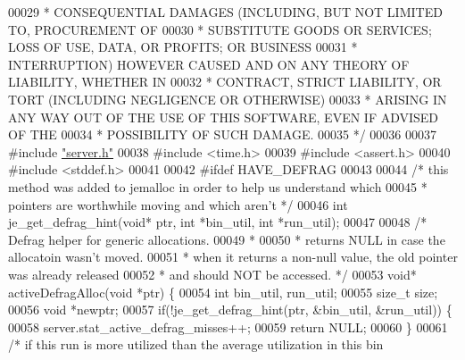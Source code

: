 \begin{DoxyCode}
00029 \textcolor{comment}{ * CONSEQUENTIAL DAMAGES (INCLUDING, BUT NOT LIMITED TO, PROCUREMENT OF}
00030 \textcolor{comment}{ * SUBSTITUTE GOODS OR SERVICES; LOSS OF USE, DATA, OR PROFITS; OR BUSINESS}
00031 \textcolor{comment}{ * INTERRUPTION) HOWEVER CAUSED AND ON ANY THEORY OF LIABILITY, WHETHER IN}
00032 \textcolor{comment}{ * CONTRACT, STRICT LIABILITY, OR TORT (INCLUDING NEGLIGENCE OR OTHERWISE)}
00033 \textcolor{comment}{ * ARISING IN ANY WAY OUT OF THE USE OF THIS SOFTWARE, EVEN IF ADVISED OF THE}
00034 \textcolor{comment}{ * POSSIBILITY OF SUCH DAMAGE.}
00035 \textcolor{comment}{ */}
00036 
00037 \textcolor{preprocessor}{#}\textcolor{preprocessor}{include} \hyperlink{server_8h}{"server.h"}
00038 \textcolor{preprocessor}{#}\textcolor{preprocessor}{include} \textcolor{preprocessor}{<}\textcolor{preprocessor}{time}\textcolor{preprocessor}{.}\textcolor{preprocessor}{h}\textcolor{preprocessor}{>}
00039 \textcolor{preprocessor}{#}\textcolor{preprocessor}{include} \textcolor{preprocessor}{<}\textcolor{preprocessor}{assert}\textcolor{preprocessor}{.}\textcolor{preprocessor}{h}\textcolor{preprocessor}{>}
00040 \textcolor{preprocessor}{#}\textcolor{preprocessor}{include} \textcolor{preprocessor}{<}\textcolor{preprocessor}{stddef}\textcolor{preprocessor}{.}\textcolor{preprocessor}{h}\textcolor{preprocessor}{>}
00041 
00042 \textcolor{preprocessor}{#}\textcolor{preprocessor}{ifdef} \textcolor{preprocessor}{HAVE\_DEFRAG}
00043 
00044 \textcolor{comment}{/* this method was added to jemalloc in order to help us understand which}
00045 \textcolor{comment}{ * pointers are worthwhile moving and which aren't */}
00046 \textcolor{keywordtype}{int} je\_get\_defrag\_hint(\textcolor{keywordtype}{void}* ptr, \textcolor{keywordtype}{int} *bin\_util, \textcolor{keywordtype}{int} *run\_util);
00047 
00048 \textcolor{comment}{/* Defrag helper for generic allocations.}
00049 \textcolor{comment}{ *}
00050 \textcolor{comment}{ * returns NULL in case the allocatoin wasn't moved.}
00051 \textcolor{comment}{ * when it returns a non-null value, the old pointer was already released}
00052 \textcolor{comment}{ * and should NOT be accessed. */}
00053 \textcolor{keywordtype}{void}* activeDefragAlloc(\textcolor{keywordtype}{void} *ptr) \{
00054     \textcolor{keywordtype}{int} bin\_util, run\_util;
00055     size\_t size;
00056     \textcolor{keywordtype}{void} *newptr;
00057     \textcolor{keywordflow}{if}(!je\_get\_defrag\_hint(ptr, &bin\_util, &run\_util)) \{
00058         server.stat\_active\_defrag\_misses++;
00059         \textcolor{keywordflow}{return} NULL;
00060     \}
00061     \textcolor{comment}{/* if this run is more utilized than the average utilization in this bin}

\end{DoxyCode}
